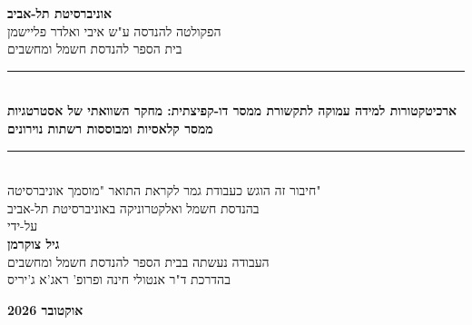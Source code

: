\documentclass[12pt,a4paper,oneside]{book}
\theoremstyle{definition}
\begin{document}
\begin{titlepage}
\begin{center}
\vspace*{0.5cm}
\begin{otherlanguage}{hebrew}

{\LARGE\textbf{אוניברסיטת תל-אביב}}\\[6pt]
{\large הפקולטה להנדסה ע"ש איבי ואלדר פליישמן}\\[4pt]
{\large בית הספר להנדסת חשמל ומחשבים}\\[1.5cm]

\noindent\rule{\textwidth}{2pt}\\[0.4cm]
{\LARGE\bfseries
ארכיטקטורות למידה עמוקה לתקשורת ממסר דו-קפיצתית: מחקר השוואתי של אסטרטגיות ממסר קלאסיות ומבוססות רשתות נוירונים}\\[6pt]
\noindent\rule{\textwidth}{2pt}\\[1.2cm]

{\large חיבור זה הוגש כעבודת גמר לקראת התואר "מוסמך אוניברסיטה"}\\[4pt]
{\large בהנדסת חשמל ואלקטרוניקה באוניברסיטת תל-אביב}\\[1.5cm]

{\large על-ידי}\\[6pt]
{\Large\bfseries גיל צוקרמן}\\[1.5cm]

{\small העבודה נעשתה בבית הספר להנדסת חשמל ומחשבים \\
בהדרכת ד"ר אנטולי חינה ופרופ' ראג'א ג'יריס}\\
 
\vfill

{\large\textbf{אוקטובר 2026}}\\[1.5cm]

\end{otherlanguage}
\end{center}
\end{titlepage}
\end{document}
